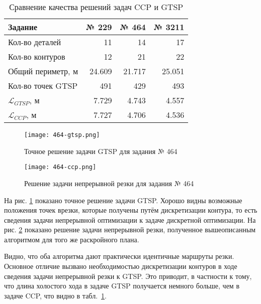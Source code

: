 \begin{table}[h!]
  \centering
  \caption{Сравнение качества решений задач CCP и GTSP}
  \label{tab:ccp-vs-gtsp}
  \def\arraystretch{1.2}
  \begin{tabular}{l|*{3}{r}}
      Задание & № 229 & № 464 & № 3211 \\
      \hline
      Кол-во деталей & 11 & 14 & 17\\
      Кол-во контуров & 12 & 21 & 22 \\
      Общий периметр, м & 24.609 & 21.717 & 25.051 \\
      Кол-во точек GTSP & 491 & 429 & 493 \\
      $\mathcal L_{GTSP}$, м & 7.729 & 4.743 & 4.557 \\
      $\mathcal L_{CCP}$, м & 7.727 & 4.706 & 4.536 \\
      \hline
  \end{tabular}
\end{table}

\begin{figure}[p]
  \begin{center}
    \texttt{[image: 464-gtsp.png]}
  \end{center}
  \caption{Точное решение задачи GTSP для задания № 464}
  \label{fig:gtsp-path}
\end{figure}

\begin{figure}[p]
  \begin{center}
    \texttt{[image: 464-ccp.png]}
  \end{center}
  \caption{Решение задачи непрерывной резки для задания № 464}
  \label{fig:ccp-path}
\end{figure}

На рис. \ref{fig:gtsp-path}
показано точное решение задачи GTSP.
Хорошо видны возможные положения точек врезки,
которые получены путём дискретизации контура,
то есть сведения задачи непрерывной оптимизации
к задаче дискретной оптимизации.
На рис. \ref{fig:ccp-path}
показано решение задачи непрерывной резки,
полученное вышеописанным алгоритмом
для того же раскройного плана.

Видно,
что оба алгоритма дают практически идентичные
маршруты резки.
Основное отличие вызвано необходимостью дискретизации
контуров в ходе сведения задачи
непрерывной резки к GTSP.
Это приводит, в частности к тому,
что длина холостого хода в задаче GTSP
получается немного больше,
чем в задаче CCP,
что видно в табл.~\ref{tab:ccp-vs-gtsp}.

